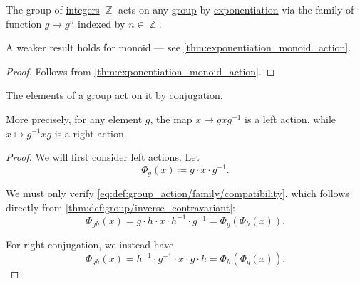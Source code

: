 \begin{proposition}\label{thm:exponentiation_group_action}
  The group of \hyperref[def:integers]{integers} \( \BbbZ \) acts on any \hyperref[def:group]{group} by \hyperref[def:monoid/exponentiation]{exponentiation} via the family of function \( g \mapsto g^n \) indexed by \( n \in \BbbZ \).
\end{proposition}
\begin{comments}
  \item A weaker result holds for monoid --- see \cref{thm:exponentiation_monoid_action}.
\end{comments}
\begin{proof}
  Follows from \cref{thm:exponentiation_monoid_action}.
\end{proof}

\begin{proposition}\label{thm:group_conjugation_action}
  The elements of a \hyperref[def:group]{group} \hyperref[def:group_action]{act} on it by \hyperref[def:group_conjugation]{conjugation}.

  More precisely, for any element \( g \), the map \( x \mapsto g x g^{-1} \) is a left action, while \( x \mapsto g^{-1} x g \) is a right action.
\end{proposition}
\begin{proof}
  We will first consider left actions. Let
  \begin{equation*}
    \Phi_g(x) \coloneqq g \cdot x \cdot g^{-1}.
  \end{equation*}

  We must only verify \eqref{eq:def:group_action/family/compatibility}, which follows directly from \cref{thm:def:group/inverse_contravariant}:
  \begin{equation*}
    \Phi_{gh}(x)
    =
    g \cdot h \cdot x \cdot h^{-1} \cdot g^{-1}
    =
    \Phi_g(\Phi_h(x)).
  \end{equation*}

  For right conjugation, we instead have
  \begin{equation*}
    \Phi_{gh}(x)
    =
    h^{-1} \cdot g^{-1} \cdot x \cdot g \cdot h
    =
    \Phi_h(\Phi_g(x)).
  \end{equation*}
\end{proof}


